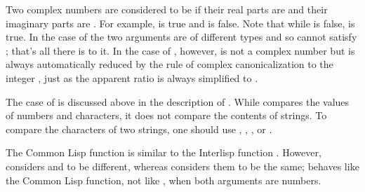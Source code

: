 \begin{defun}[Function]
Two complex numbers are considered to be 
if their real parts are  and their imaginary parts are .
For example,  is true and
 is false.
Note that while  is false,
 is true.
In the case of  the
two arguments are of different types
and so cannot satisfy ; that's all there is to it.
In the case of , however,
 is not a complex number but
is always automatically reduced by the rule of complex
canonicalization to the integer ,
just as the apparent ratio  is always simplified to .

The case of  is discussed above in the description
of .  While  compares the values of numbers and
characters, it does not compare the contents of strings.  To compare
the characters of two strings, one should use , ,
, or .

\beforenoterule
\begin{incompatibility}
The Common Lisp function  is similar to the
Interlisp function .  However,  considers  and
 to be different, whereas  considers them to be the same;
 behaves like the Common Lisp \cdf{=} function, not like ,
when both arguments are numbers.
\end{incompatibility}
\afternoterule
\end{defun}


